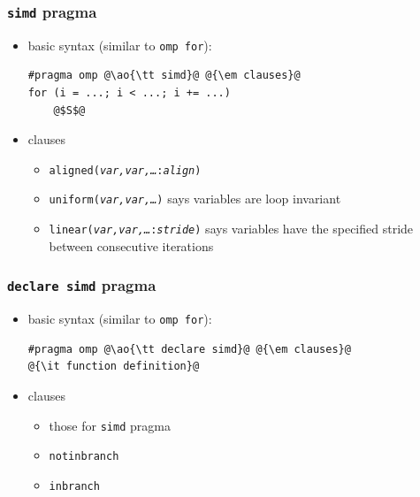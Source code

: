 \documentclass[12pt,dvipdfmx]{beamer}
\newcommand{\ao}[1]{{\color{blue}#1}}
\begin{document}
\begin{frame}[fragile]
\frametitle{{\tt simd} pragma}
\begin{itemize}
\item basic syntax (similar to {\tt omp for}):
\begin{lstlisting}
#pragma omp @\ao{\tt simd}@ @{\em clauses}@
for (i = ...; i < ...; i += ...) 
    @$S$@
\end{lstlisting}

\item clauses
  \begin{itemize}
  \item {\tt aligned({\it var,var,\ldots}:{\it align})}
  \item {\tt uniform({\it var,var,\ldots})} says variables are loop invariant
  \item {\tt linear({\it var,var,\ldots}:{\it stride})} 
    says variables have the specified stride between consecutive iterations
  \end{itemize}
\end{itemize}
\end{frame}


\begin{frame}[fragile]
\frametitle{{\tt declare simd} pragma}
\begin{itemize}
\item basic syntax (similar to {\tt omp for}):
\begin{lstlisting}
#pragma omp @\ao{\tt declare simd}@ @{\em clauses}@
@{\it function definition}@
\end{lstlisting}

\item clauses
  \begin{itemize}
  \item those for {\tt simd} pragma
  \item {\tt notinbranch}
  \item {\tt inbranch}
  \end{itemize}

\end{itemize}
\end{frame}
\end{document}
